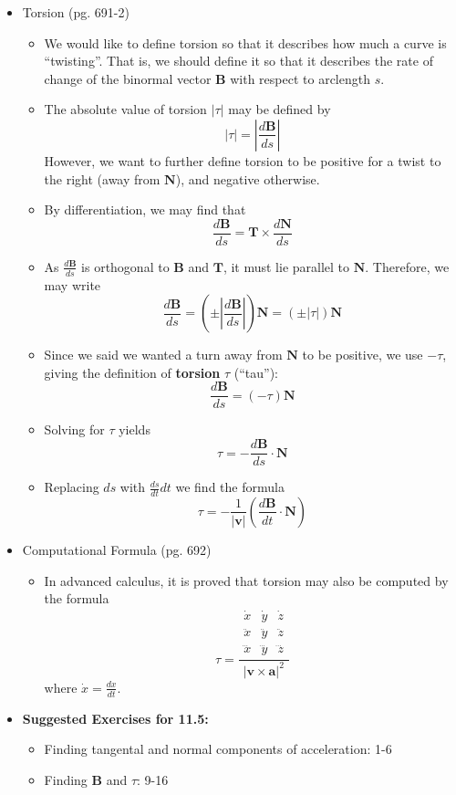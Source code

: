 \documentclass[12pt]{article}
\theoremstyle{plain}
\theoremstyle{definition}
\theoremstyle{remark}
\newcommand{\vect}[1]{\mathbf{#1}}
\begin{document}
\begin{itemize}
	\item Torsion (pg. 691-2)
	
		\begin{itemize}
		\item We would like to define torsion so that it describes how much a curve is ``twisting''. That is, we should define it so that it describes the rate of change of the binormal vector $\vect{B}$ with respect to arclength $s$.
		\item The absolute value of torsion $|\tau|$ may be defined by \[|\tau| = \left|\frac{d\vect{B}}{ds}\right|\] However, we want to further define torsion to be positive for a twist to the right (away from $\vect{N}$), and negative otherwise. 
		\item By differentiation, we may find that \[\frac{d\vect{B}}{ds} = \vect{T} \times \frac{d\vect{N}}{ds}\]
		\item As $\frac{d\vect{B}}{ds}$ is orthogonal to $\vect{B}$ and $\vect{T}$, it must lie parallel to $\vect{N}$.  Therefore, we may write \[\frac{d\vect{B}}{ds} = \left(\pm\left|\frac{d\vect{B}}{ds}\right|\right)\vect{N}=(\pm|\tau|)\vect{N}\]
		\item Since we said we wanted a turn away from $\vect{N}$ to be positive, we use $-\tau$, giving the definition of \textbf{torsion} $\tau$ (``tau''): \[\frac{d\vect{B}}{ds} = (-\tau)\vect{N}\]
		\item Solving for $\tau$ yields \[\tau = -\frac{d\vect{B}}{ds}\cdot \vect{N}\]
		\item Replacing $ds$ with $\frac{ds}{dt}dt$ we find the formula \[\tau = -\frac{1}{|\vect{v}|}\left(\frac{d\vect{B}}{dt}\cdot\vect{N}\right)\]
		\end{itemize}
		\newpage
	\item Computational Formula (pg. 692)

		\begin{itemize}
		\item In advanced calculus, it is proved that torsion may also be computed by the formula
	\[
	\tau
	=
	\frac{
	\begin{array}{|ccc|}
	\dot{x} & \dot{y} & \dot{z} \\
	\ddot{x} & \ddot{y} & \ddot{z} \\
	\dddot{x} & \dddot{y} & \dddot{z}
	\end{array}
	}{
	|\vect{v}\times\vect{a}|^2
	}
	\]
	where $\dot{x}=\frac{dx}{dt}$.
		\end{itemize}
		
	\item \textbf{ Suggested Exercises for 11.5:}
	
		\begin{itemize}
		\item Finding tangental and normal components of acceleration: 1-6
		\item Finding $\vect{B}$ and $\tau$: 9-16
		\end{itemize}
	
	\end{itemize}
	
\end{document}
